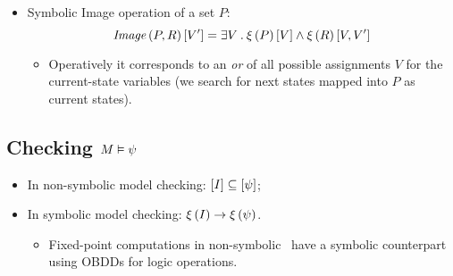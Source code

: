 \begin{itemize}
\begin{itemize}
        \end{itemize}

    \item   Symbolic Image operation of a set $P$:
        \[
        \mbox{\emph{Image}}\left({P,R}\right)[V'] = \exists V \:.\: \xi\left({P}\right)[V] \wedge
                          \xi\left({R}\right)[V, V^\prime]
        \]
        \begin{itemize}

        \item   Operatively it corresponds to an \emph{or} of all possible
                assignments $V$ for the current-state variables (we search
                for next states mapped into $P$ as current states).

        \end{itemize}

    \end{itemize}

\subsection{Checking $M \vDash \psi$}

    \begin{itemize}

    \item   In non-symbolic model checking: $\left[{I}\right] \subseteq
            \left[{\psi}\right]$;

    \item   In symbolic model checking: $\xi\left({I}\right) \rightarrow \xi\left({\psi}\right)$.

        \begin{itemize}
        \item   Fixed-point computations in non-symbolic \CTL\ have a
                symbolic counterpart using OBDDs for logic operations.
        \end{itemize}

    \end{itemize}


